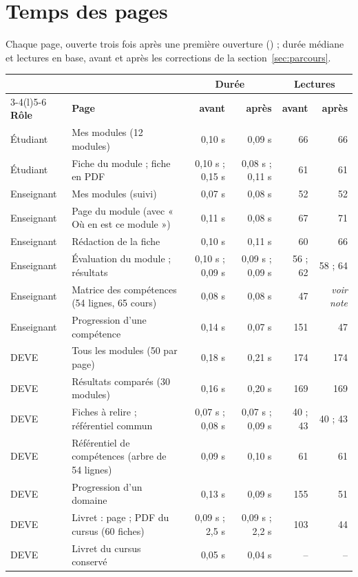 \documentclass[11pt,a4paper]{article}
\newcommand{\code}[1]{\texttt{\detokenize{#1}}}
\begin{document}
\section{Temps des pages}

Chaque page, ouverte trois fois après une première ouverture (\code{syllabus_pages.py}) ; durée
médiane et lectures en base, avant et après les corrections de la section~\ref{sec:parcours}.

\begin{center}
\small
\begin{tabularx}{\linewidth}{@{}l X r r r r@{}}
\toprule
& & \multicolumn{2}{c}{\textbf{Durée}} & \multicolumn{2}{c}{\textbf{Lectures}} \\
\cmidrule(lr){3-4}\cmidrule(l){5-6}
\textbf{Rôle} & \textbf{Page} & \textbf{avant} & \textbf{après} & \textbf{avant} & \textbf{après} \\
\midrule
Étudiant & Mes modules (12 modules) & 0,10 s & 0,09 s & 66 & 66 \\
Étudiant & Fiche du module ; fiche en PDF & 0,10 s ; 0,15 s & 0,08 s ; 0,11 s & 61 & 61 \\
Enseignant & Mes modules (suivi) & 0,07 s & 0,08 s & 52 & 52 \\
Enseignant & Page du module (avec « Où en est ce module ») & 0,11 s & 0,08 s & 67 & 71 \\
Enseignant & Rédaction de la fiche & 0,10 s & 0,11 s & 60 & 66 \\
Enseignant & Évaluation du module ; résultats & 0,10 s ; 0,09 s & 0,09 s ; 0,09 s & 56 ; 62 & 58 ; 64 \\
Enseignant & Matrice des compétences (54 lignes, 65 cours) & 0,08 s & 0,08 s & 47 & \textit{voir note} \\
Enseignant & Progression d'une compétence & 0,14 s & 0,07 s & 151 & 47 \\
DEVE & Tous les modules (50 par page) & 0,18 s & 0,21 s & 174 & 174 \\
DEVE & Résultats comparés (30 modules) & 0,16 s & 0,20 s & 169 & 169 \\
DEVE & Fiches à relire ; référentiel commun & 0,07 s ; 0,08 s & 0,07 s ; 0,09 s & 40 ; 43 & 40 ; 43 \\
DEVE & Référentiel de compétences (arbre de 54 lignes) & 0,09 s & 0,10 s & 61 & 61 \\
DEVE & Progression d'un domaine & 0,13 s & 0,09 s & 155 & 51 \\
DEVE & Livret : page ; PDF du cursus (60 fiches) & 0,09 s ; 2,5 s & 0,09 s ; 2,2 s & 103 & 44 \\
DEVE & Livret du cursus conservé & 0,05 s & 0,04 s & -- & -- \\
\bottomrule
\end{tabularx}
\end{center}
\end{document}
